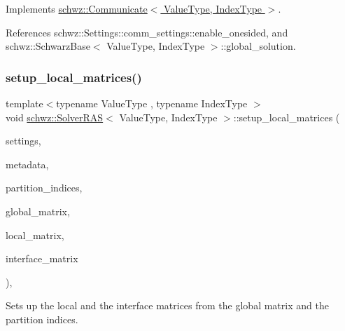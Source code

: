 Implements \hyperlink{classschwz_1_1Communicate_a9f305bc37b86b1cf9369acdf6fe32f7d}{schwz\+::\+Communicate$<$ Value\+Type, Index\+Type $>$}.



References schwz\+::\+Settings\+::comm\+\_\+settings\+::enable\+\_\+onesided, and schwz\+::\+Schwarz\+Base$<$ Value\+Type, Index\+Type $>$\+::global\+\_\+solution.

\mbox{\label{classschwz_1_1SolverRAS_aebbdd245b7019af802606ad95a8e3a5a}} 
\subsubsection{\texorpdfstring{setup\+\_\+local\+\_\+matrices()}{setup\_local\_matrices()}}
{\footnotesize\ttfamily template$<$typename Value\+Type , typename Index\+Type $>$ \\
void \hyperlink{classschwz_1_1SolverRAS}{schwz\+::\+Solver\+R\+AS}$<$ Value\+Type, Index\+Type $>$\+::setup\+\_\+local\+\_\+matrices (\begin{DoxyParamCaption}\item[{\hyperlink{structschwz_1_1Settings}{Settings} \&}]{settings,  }\item[{\hyperlink{structschwz_1_1Metadata}{Metadata}$<$ Value\+Type, Index\+Type $>$ \&}]{metadata,  }\item[{std\+::vector$<$ unsigned int $>$ \&}]{partition\+\_\+indices,  }\item[{std\+::shared\+\_\+ptr$<$ gko\+::matrix\+::\+Csr$<$ Value\+Type, Index\+Type $>$$>$ \&}]{global\+\_\+matrix,  }\item[{std\+::shared\+\_\+ptr$<$ gko\+::matrix\+::\+Csr$<$ Value\+Type, Index\+Type $>$$>$ \&}]{local\+\_\+matrix,  }\item[{std\+::shared\+\_\+ptr$<$ gko\+::matrix\+::\+Csr$<$ Value\+Type, Index\+Type $>$$>$ \&}]{interface\+\_\+matrix }\end{DoxyParamCaption})\hspace{0.3cm}{\ttfamily [override]}, {\ttfamily [virtual]}}



Sets up the local and the interface matrices from the global matrix and the partition indices. 


